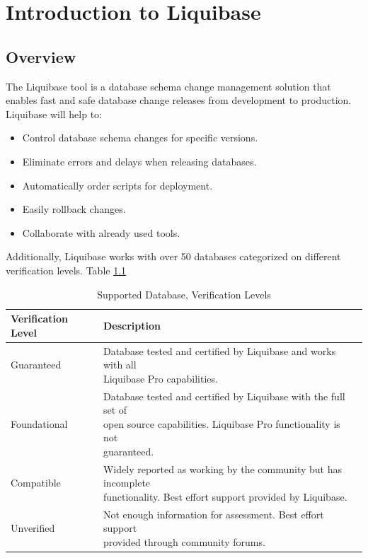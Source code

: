 

\chapter{Introduction to Liquibase}
\section{Overview}
%
The Liquibase tool is a database schema change management solution that enables fast and safe database change releases from development to production. Liquibase \cite{Liquibase} will help to:

\begin{itemize}
	\item Control database schema changes for specific versions.
	\item Eliminate errors and delays when releasing databases.
	\item Automatically order scripts for deployment.
	\item Easily rollback changes.
	\item Collaborate with already used tools.
\end{itemize}

%
Additionally, Liquibase works with over 50 databases categorized on different verification levels. Table \ref{tab:IntroductionToLiquibase:DBVerificationLevels}

\begin{table}[H]
	\centering
	\begin{tabularx}{\textwidth}{ll} 
		\toprule
		Verification Level & Description \\ 
		\midrule
		Guaranteed & \makecell[l]{Database tested and certified by Liquibase and works with all\\ Liquibase Pro capabilities.} \\[10pt]
		Foundational & \makecell[l]{Database tested and certified by Liquibase with the full set of\\ open source capabilities. Liquibase Pro functionality is not\\ guaranteed.} \\[15pt]
		Compatible & \makecell[l]{Widely reported as working by the community but has incomplete\\ functionality. Best effort support provided by Liquibase.} \\[10pt]
		Unverified & \makecell[l]{Not enough information for assessment. Best effort support\\ provided through community forums.} \\
		\bottomrule
	\end{tabularx}
	\caption{Supported Database, Verification Levels}
	\label{tab:IntroductionToLiquibase:DBVerificationLevels}
\end{table}

